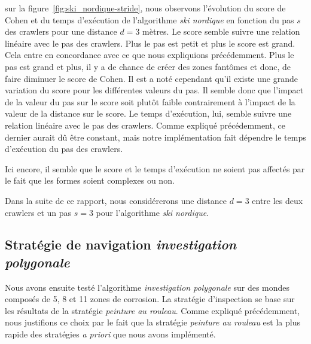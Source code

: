 \documentclass[francais,RandD]{rapportPFE}
\begin{document}
			sur la figure~\ref{fig:ski_nordique-stride}, nous observons l'évolution du score de Cohen et du temps d'exécution de l'algorithme \textit{ski nordique} en fonction du pas $s$ des crawlers pour une distance $d = 3$ mètres.
			Le score semble suivre une relation linéaire avec le pas des crawlers.
			Plus le pas est petit et plus le score est grand.
			Cela entre en concordance avec ce que nous expliquions précédemment.
			Plus le pas est grand et plus, il y a de chance de créer des zones fantômes et donc, de faire diminuer le score de Cohen.
			Il est a noté cependant qu'il existe une grande variation du score pour les différentes valeurs du pas.
			Il semble donc que l'impact de la valeur du pas sur le score soit plutôt faible contrairement à l'impact de la valeur de la distance sur le score.
			Le temps d'exécution, lui, semble suivre une relation linéaire avec le pas des crawlers.
			Comme expliqué précédemment, ce dernier aurait dû être constant, mais notre implémentation fait dépendre le temps d'exécution du pas des crawlers.

			Ici encore, il semble que le score et le temps d'exécution ne soient pas affectés par le fait que les formes soient complexes ou non.

			Dans la suite de ce rapport, nous considérerons une distance $d = 3$ entre les deux crawlers et un pas $s = 3$ pour l'algorithme \textit{ski nordique}.
		\subsection*{Stratégie de navigation \textit{investigation polygonale}}
			Nous avons ensuite testé l'algorithme \textit{investigation polygonale} sur des mondes composés de 5, 8 et 11 zones de corrosion.
			La stratégie d'inspection se base sur les résultats de la stratégie \textit{peinture au rouleau}.
			Comme expliqué précédemment, nous justifions ce choix par le fait que la stratégie \textit{peinture au rouleau} est la plus rapide des stratégies \textit{a priori} que nous avons implémenté.
\end{document}
